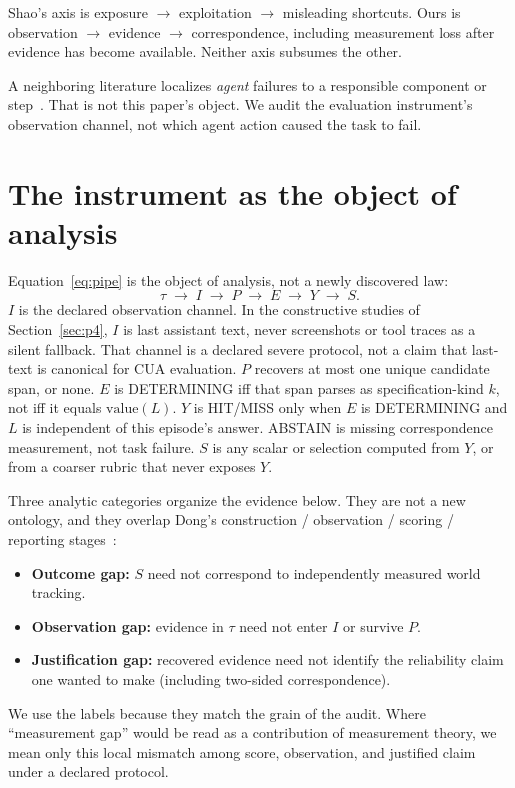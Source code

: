 \documentclass[sigconf,anonymous]{aamas}
\begin{document}
Shao's axis is exposure $\to$ exploitation $\to$ misleading shortcuts.
Ours is observation $\to$ evidence $\to$ correspondence, including measurement loss after evidence has become available.
Neither axis subsumes the other.

A neighboring literature localizes \emph{agent} failures to a responsible component or step~\citep{zhang2025whoandwhen}.
That is not this paper's object.
We audit the evaluation instrument's observation channel, not which agent action caused the task to fail.

\section{The instrument as the object of analysis}
\label{sec:measurement}

Equation~\eqref{eq:pipe} is the object of analysis, not a newly discovered law:
\begin{equation}
\tau \;\longrightarrow\; I \;\longrightarrow\; P \;\longrightarrow\; E \;\longrightarrow\; Y \;\longrightarrow\; S.
\label{eq:pipe}
\end{equation}
$I$ is the declared observation channel.
In the constructive studies of Section~\ref{sec:p4}, $I$ is last assistant text, never screenshots or tool traces as a silent fallback.
That channel is a declared severe protocol, not a claim that last-text is canonical for CUA evaluation.
$P$ recovers at most one unique candidate span, or none.
$E$ is DETERMINING iff that span parses as specification-kind $k$, not iff it equals $\mathrm{value}(L)$.
$Y$ is HIT/MISS only when $E$ is DETERMINING and $L$ is independent of this episode's answer.
ABSTAIN is missing correspondence measurement, not task failure.
$S$ is any scalar or selection computed from $Y$, or from a coarser rubric that never exposes $Y$.

Three analytic categories organize the evidence below.
They are not a new ontology, and they overlap Dong's construction / observation / scoring / reporting stages~\citep{dong2026misscore}:
\begin{itemize}[leftmargin=1.4em,itemsep=2pt]
\item \textbf{Outcome gap:} $S$ need not correspond to independently measured world tracking.
\item \textbf{Observation gap:} evidence in $\tau$ need not enter $I$ or survive $P$.
\item \textbf{Justification gap:} recovered evidence need not identify the reliability claim one wanted to make (including two-sided correspondence).
\end{itemize}
We use the labels because they match the grain of the audit.
Where ``measurement gap'' would be read as a contribution of measurement theory, we mean only this local mismatch among score, observation, and justified claim under a declared protocol.
\end{document}
